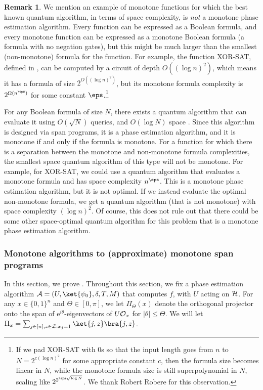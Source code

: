 \documentclass[11pt]{article}
\numberwithin{equation}{section}
\theoremstyle{definition}
\newtheorem{remark}[theorem]{Remark}
\theoremstyle{plain}
\newcommand{\eee}{\mathrm e}
\begin{document}
\begin{remark}\label{rem:non-monotone}
We mention an example of monotone functions for which the best known quantum algorithm, in terms of space complexity, is \emph{not} a monotone phase estimation algorithm. Every function can be expressed as a Boolean formula, and every monotone function can be expressed as a monotone Boolean formula (a formula with no negation gates), but this might be much larger than the smallest (non-monotone) formula for the function. For example, the function XOR-SAT, defined in \cite{GKRS18}, can be computed by a circuit of depth $O((\log n)^2)$, which means it has a formula of size $2^{O((\log n)^2)}$, but its monotone formula complexity is $2^{\Omega(n^{\eps})}$ for some constant $\eps$.\footnote{If we pad XOR-SAT with 0s so that the input length goes from $n$ to $N=2^{c(\log n)^2}$ for some appropriate constant $c$, then the formula size becomes linear in $N$, while the monotone formula size is still superpolynomial in $N$, scaling like $2^{2^{\eps\sqrt{\log N}}}$. We thank Robert Robere for this observation.} 

For any Boolean formula of size $N$, there exists a quantum algorithm that can evaluate it using $O(\sqrt{N})$ queries, and $O(\log N)$ space \cite{Rei09,JK16}. Since this algorithm is designed via span programs, it is a phase estimation algorithm, and it is monotone if and only if the formula is monotone. For a function for which there is a separation between the monotone and non-monotone formula complexities, the smallest space quantum algorithm of this type will not be monotone. For example, for XOR-SAT, we could use a quantum algorithm that evaluates a monotone formula and has space complexity $n^{\eps}$. This is a monotone phase estimation algorithm, but it is not optimal. If we instead evaluate the optimal non-monotone formula, we get a quantum algorithm (that is not monotone) with space complexity $(\log n)^2$. 
 Of course, this does not rule out that there could be some other space-optimal quantum algorithm for this problem that is a monotone phase estimation algorithm. 
\end{remark}

\subsubsection{Monotone algorithms to (approximate) monotone span programs}\label{sec:monotone-alg-to-span}

In this section, we prove .
Throughout this section, we fix a phase estimation algorithm ${\cal A}=(U,\ket{\psi_0},\delta,T,M)$ that computes $f$, with $U$ acting on ${\cal H}$. For any $x\in\{0,1\}^n$ and $\Theta\in [0,\pi]$, we let $\Pi_{\Theta}(x)$ denote the orthogonal projector onto the span of $\eee^{i\theta}$-eigenvectors of $U{\cal O}_x$ for $|\theta|\leq \Theta$. We will let $\Pi_x=\sum_{j\in [n],z\in{\cal Z}: x_j=1}\ket{j,z}\bra{j,z}$.
\end{document}
